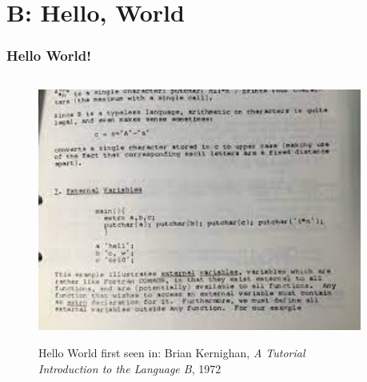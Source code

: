 \section{B: Hello, World}

\begin{frame}[fragile]
\frametitle{Hello World!}

\begin{columns}
\begin{column}{0.5\textwidth}
\begin{figure}[h]
\centerline{
\includegraphics[width=1.0\textwidth]{../Figs/hello-in-b.jpg}
}
\centerline{
{\tiny Hello World first seen in: Brian Kernighan, {\it A Tutorial Introduction to the Language B}, 1972}
}
\end{figure}
\end{column}

\pause
\begin{column}{0.45\textwidth}

\end{column}

\end{columns}
\end{frame}



